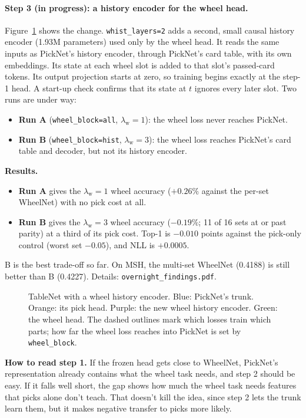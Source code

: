 \documentclass[11pt,letterpaper]{article}
\newcommand{\code}[1]{\texttt{\small #1}}
\begin{document}
\paragraph{Step 3 (in progress): a history encoder for the wheel head.} Figure~\ref{fig:whist} shows the change.
\code{whist\_layers=2} adds a second, small causal history encoder (1.93M parameters) used only by the wheel head.
It reads the same inputs as PickNet's history encoder, through PickNet's card table, with its own embeddings. Its
state at each wheel slot is added to that slot's passed-card tokens. Its output projection starts at zero, so
training begins exactly at the step-1 head. A start-up check confirms that its state at $t$ ignores every later
slot. Two runs are under way:
\begin{itemize}
\item \textbf{Run A} (\code{wheel\_block=all}, $\lambda_{\text{w}}=1$): the wheel loss never reaches PickNet.
\item \textbf{Run B} (\code{wheel\_block=hist}, $\lambda_{\text{w}}=3$): the wheel loss reaches PickNet's card
table and decoder, but not its history encoder.
\end{itemize}
\noindent\textbf{Results.}
\begin{itemize}
\item \textbf{Run A} gives the $\lambda_{\text{w}}=1$ wheel accuracy ($+0.26\%$ against the per-set WheelNet) with no
pick cost at all.
\item \textbf{Run B} gives the $\lambda_{\text{w}}=3$ wheel accuracy ($-0.19\%$; 11 of 16 sets at or past parity) at a
third of its pick cost. Top-1 is $-0.010$ points against the pick-only control (worst set $-0.05$), and NLL is
$+0.0005$.
\end{itemize}
B is the best trade-off so far. On MSH, the multi-set WheelNet (0.4188) is still better than B (0.4227). Details:
\code{overnight\_findings.pdf}.

\begin{figure}[!htbp]
\centering
\resizebox{\linewidth}{!}{}
\caption{TableNet with a wheel history encoder. Blue: PickNet's trunk. Orange: its pick head. Purple: the new wheel
history encoder. Green: the wheel head. The dashed outlines mark which losses train which parts; how far the wheel
loss reaches into PickNet is set by \code{wheel\_block}.}
\label{fig:whist}
\end{figure}

\noindent\textbf{How to read step 1.} If the frozen head gets close to WheelNet, PickNet's representation
already contains what the wheel task needs, and step 2 should be easy. If it falls well short, the gap shows
how much the wheel task needs features that picks alone don't teach. That doesn't kill the idea, since step 2
lets the trunk learn them, but it makes negative transfer to picks more likely.
\end{document}
